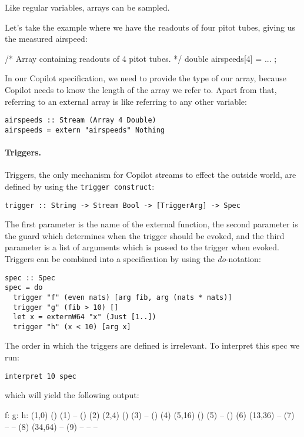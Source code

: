 Like regular variables, arrays can be sampled.
\begin{example}
\label{exmp:pitot}
Let's take the example where we
have the readouts of four pitot tubes, giving us the measured airspeed:
\begin{code}[frame=single]
/* Array containing readouts of 4 pitot tubes. */
double airspeeds[4] = ... ;
\end{code}
In our Copilot specification, we need to provide the type of our array, because
Copilot needs to know the length of the array we refer to. Apart from that,
referring to an external array is like referring to any other variable:
\begin{lstlisting}[language=Copilot, frame=single]
airspeeds :: Stream (Array 4 Double)
airspeeds = extern "airspeeds" Nothing
\end{lstlisting}
\end{example}


\paragraph{Triggers.}
Triggers, the only mechanism for Copilot streams to effect the outside world,
are defined by using the {\tt trigger construct}:
%
\begin{lstlisting}[language = Copilot, frame = single]
trigger :: String -> Stream Bool -> [TriggerArg] -> Spec
\end{lstlisting}
%
The first parameter is the name of the external function, the second parameter is the
guard which determines when the trigger should be evoked, and the third parameter
is a list of arguments which is passed to the trigger when evoked.
Triggers can be combined into a specification by using the \emph{do}-notation:
%
\begin{lstlisting}[language = Copilot, frame = single]
spec :: Spec
spec = do
  trigger "f" (even nats) [arg fib, arg (nats * nats)]
  trigger "g" (fib > 10) []
  let x = externW64 "x" (Just [1..])
  trigger "h" (x < 10) [arg x]
\end{lstlisting}
%
The order in which the triggers are defined is irrelevant. To interpret this spec we run:
%
\begin{lstlisting}[language = Copilot, frame = single]
interpret 10 spec
\end{lstlisting}
%
which will yield the following output:
%
\begin{code}
f:        g:	 h:
(1,0)     ()        (1)
--        ()        (2)
(2,4)     ()        (3)
--        ()        (4)
(5,16)    ()        (5)
--        ()        (6)
(13,36)   --	(7)
--        --        (8)
(34,64)   --	(9)
--        --         --
\end{code}
%

